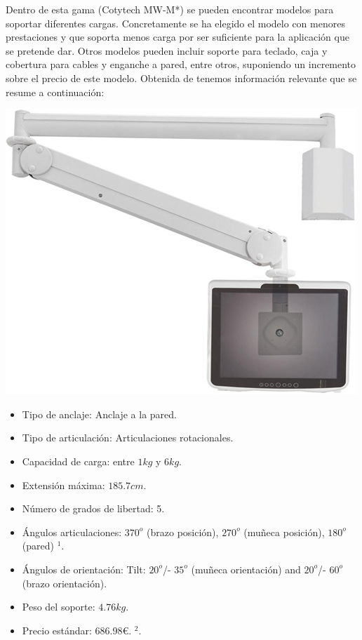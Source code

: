 Dentro de esta gama (Cotytech MW-M*) se pueden encontrar modelos para soportar diferentes cargas. Concretamente se ha elegido el modelo con menores prestaciones y que soporta menos carga por ser suficiente para la aplicación que se pretende dar. Otros modelos pueden incluir soporte para teclado, caja y cobertura para cables y enganche a pared, entre otros, suponiendo un incremento sobre el precio de este modelo. Obtenida de \cite{CotytechMWM13P:2018} tenemos información relevante que se resume a continuación:

\begin{minipage}{0.35\textwidth}
	\includegraphics[width=\linewidth]{figuras/Imagenes_EstadoArte/Cotytech_MW-M13P.jpg}
\end{minipage}
\begin{minipage}{0.65\textwidth}\raggedright
	\hspace{1cm}
	\begin{itemize}
		\item Tipo de anclaje: Anclaje a la pared.
		\item Tipo de articulación: Articulaciones rotacionales.
		\item Capacidad de carga: entre $1kg$ y $6kg$.
		\item Extensión máxima: $185.7cm$.
		\item Número de grados de libertad: 5.
		\item Ángulos articulaciones: $370^o$ (brazo posición), $270^o$ (muñeca posición), $180^o$ (pared) $^1$. %
		\item Ángulos de orientación: Tilt: $20^o$/- $35^o$ (muñeca orientación) and $20^o$/- $60^o$ (brazo orientación).
		\item Peso del soporte: $4.76 kg$.
		\item Precio estándar: 686.98\euro. $^2$. %
	\end{itemize}
\end{minipage}
\\

